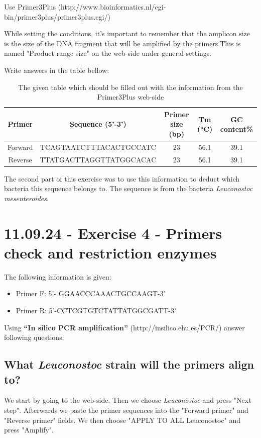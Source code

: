 \vspace{1em}
Use Primer3Plus (http://www.bioinformatics.nl/cgi-bin/primer3plus/primer3plus.cgi/)

\vspace{1em}
While setting the conditions, it's important to remember that the amplicon size is the size of the DNA fragment that will be amplified by the primers.This is named "Product range size" on the web-side under general settings.

\vspace{1em}
Write answers in the table bellow:
\begin{table}[h]
    \centering
    \caption{The given table which should be filled out with the information from the Primer3Plus web-side}
    \label{tab:Exercise3PrimerTable}
    \begin{tabular}{c|c|c|c|c}
        \textbf{Primer} & \textbf{Sequence (5'-3')} & \textbf{Primer size (bp)} & \textbf{Tm (°C)} & \textbf{GC content\%} \\
        \hline
        Forward & TCAGTAATCTTTACACTGCCATC & 23 & 56.1 & 39.1 \\
        Reverse & TTATGACTTAGGTTATGGCACAC & 23 & 56.1 & 39.1 \\
    \end{tabular}
\end{table}

The second part of this exercise was to use this information to deduct which bacteria this sequence belongs to. The sequence is from the bacteria \textit{Leuconostoc mesenteroides}.

\section{11.09.24 - Exercise 4 - Primers check and restriction enzymes}
The following information is given:
\begin{itemize}
    \item Primer F: 5’- GGAACCCAAACTGCCAAGT-3’
    \item Primer R: 5’-CCTCGTGTCTATTATGGCGATT-3’
\end{itemize}

Using \textbf{“In silico PCR amplification”} (http://insilico.ehu.es/PCR/) answer following questions:

\subsection{What \textit{Leuconostoc} strain will the primers align to?}
We start by going to the web-side. Then we choose \textit{Leuconostoc} and press "Next step". Afterwards we paste the primer sequences into the "Forward primer" and "Reverse primer" fields. We then choose "APPLY TO ALL Leuconostoc" and press "Amplify".

